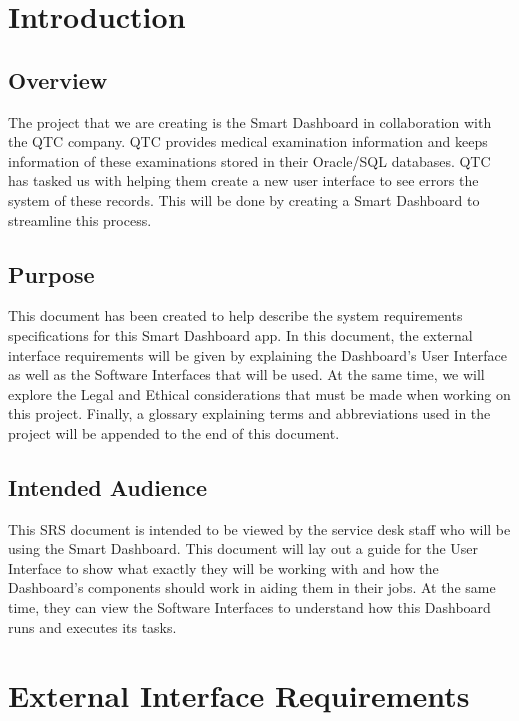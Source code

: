 \documentclass{article}
\begin{document}
\section{Introduction}
\subsection{Overview}
The project that we are creating is the Smart Dashboard in collaboration with the QTC company. QTC provides medical examination information and keeps information of these examinations stored in their Oracle/SQL databases. QTC has tasked us with helping them create a new user interface to see errors the system of these records. This will be done by creating a Smart Dashboard to streamline this process.
\subsection{Purpose}
This document has been created to help describe the system requirements specifications for this Smart Dashboard app. In this document, the external interface requirements will be given by explaining the Dashboard's User Interface as well as the Software Interfaces that will be used. At the same time, we will explore the Legal and Ethical considerations that must be made when working on this project. Finally, a glossary explaining terms and abbreviations used in the project will be appended to the end of this document.
\subsection{Intended Audience}
This SRS document is intended to be viewed by the service desk staff who will be using the Smart Dashboard. This document will lay out a guide for the User Interface to show what exactly they will be working with and how the Dashboard's components should work in aiding them in their jobs. At the same time, they can view the Software Interfaces to understand how this Dashboard runs and executes its tasks.


\section{External Interface Requirements}
\end{document}
